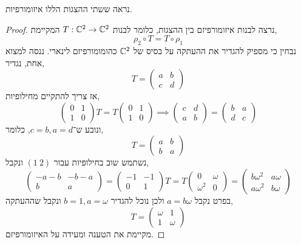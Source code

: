 \subquestion{}
נראה ששתי ההצגות הללו איזומורפיות.
\begin{proof}
	נרצה לבנות איזומורפיזם בין ההצגות, כלומר לבנות $T : \mathbb{C}^2 \to \mathbb{C}^2$ המקיימת,
	\[
		\rho_2 \circ T
		= T \circ \rho_1
	\]
	נבחין כי מספיק להגדיר את ההעתקה על בסיס של $\mathbb{C}^2$ כהומומורפיזם לינארי.
	ננסה למצוא אחת, נגדיר,
	\[
		T
		= \begin{pmatrix}
			a & b \\
			c & d
		\end{pmatrix}
	\]
	אז צריך להתקיים מחילופיות,
	\[
		\begin{pmatrix}
			0 & 1 \\
			1 & 0
		\end{pmatrix} T
		= T
		\begin{pmatrix}
			0 & 1 \\
			1 & 0
		\end{pmatrix}
		\implies
		\begin{pmatrix}
			c & d \\
			a & b
		\end{pmatrix}
		= \begin{pmatrix}
			b & a \\
			d & c
		\end{pmatrix}
	\]
	ונובע ש־$c = b, a = d$, כלומר,
	\[
		T
		= \begin{pmatrix}
			a & b \\
			b & a
		\end{pmatrix}
	\]
	נשתמש שוב בחילופיות עבור $(1\ 2)$ ונקבל,
	\[
		\begin{pmatrix}
			-a - b & -b - a \\
			b & a
		\end{pmatrix}
		= \begin{pmatrix}
			-1 & -1 \\
			0 & 1
		\end{pmatrix} T
		= T \begin{pmatrix}
			0 & \omega \\
			\omega^2 & 0
		\end{pmatrix}
		= \begin{pmatrix}
			b \omega^2 & a \omega \\
			a \omega^2 & b \omega
		\end{pmatrix}
	\]
	בפרט נקבל $a = b \omega$ ולכן נוכל להגדיר $b = 1, a = \omega$ ונקבל שההעתקה,
	\[
		T
		= \begin{pmatrix}
			\omega & 1 \\
			1 & \omega
		\end{pmatrix}
	\]
	מקיימת את הטענה ומעידה על האיזומורפיזם.
\end{proof}

